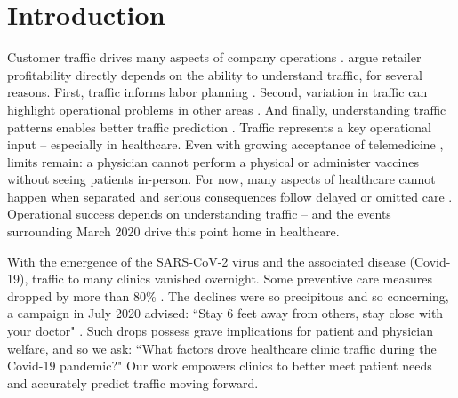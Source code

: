\section{Introduction}
 Customer traffic drives many aspects of company operations \citep{Gallino2014}. \cite{Perdikaki2012} argue retailer profitability directly depends on the ability to understand traffic, for several reasons. First, traffic informs labor planning \citep{Mani2015,Chuang2015,Perdikaki2017,Netessine2010}. Second, variation in traffic can highlight operational problems in other areas \citep{Lee2017}. And finally, understanding traffic patterns enables better traffic prediction \citep{Yung2020,Kamalahmadi2021,Abrishami2018}. Traffic represents a key operational input -- especially in healthcare. Even with growing acceptance of telemedicine \citep{WSJ_21_telemed,Friedman2021}, limits remain: a physician cannot perform a physical or administer vaccines without seeing patients in-person. For now, many aspects of healthcare cannot happen when separated \citep{Romanick-Schmiedl2020} and serious consequences follow delayed or omitted care \citep{Findling2020,CDC_ExcessDeath}. Operational success depends on understanding traffic -- and the events surrounding March 2020 drive this point home in healthcare.
 
 With the emergence of the SARS-CoV-2 virus and the associated disease (Covid-19), traffic to many clinics vanished overnight. Some preventive care measures dropped by more than 80\% \citep{Cantor2020}. The declines were so precipitous and so concerning, a campaign in July 2020 advised: “Stay 6 feet away from others, stay close with your doctor" \citep{StopMedicalDistancing.org}. Such drops possess grave implications for patient \citep{WSJ_skipDoc} and physician \citep{WSJ2020_job_losses} welfare, and so we ask: “What factors drove healthcare clinic traffic during the Covid-19 pandemic?" Our work empowers clinics to better meet patient needs \citep[as in][]{Musalem2020} and accurately predict traffic moving forward. 

